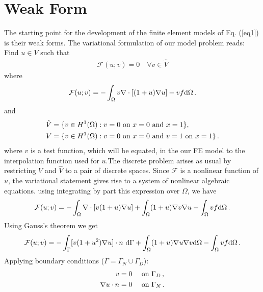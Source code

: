 \documentclass[]{article}
\begin{document}
\section{Weak Form} \label{sec: wf}
The starting point for the development of the finite element models of Eq. (\ref{eq1}) is their weak forms.
The variational formulation of our model problem reads: Find $u \in V$ such that
\begin{equation}\label{eq4}
	\begin{aligned}
		\mathcal{F}(u;v) = 0 \quad \forall v \in \hat{V}
	\end{aligned}
\end{equation}
where
\begin{equation}\label{eq5}
	\begin{aligned}
		\mathcal{F}(u; v) =-\int_\Omega v \nabla \cdot[(1+u) \nabla u] - v f \mathrm{d}\Omega\thinspace .
	\end{aligned}
\end{equation}
and
\begin{equation}\label{eq6}
	\begin{aligned}
		\hat{V} &= \{v \in H^1(\Omega) : v = 0 \text{ on } x=0\mbox{ and }x=1\}, \\
		V &= \{v \in H^1(\Omega) : v = 0 \text{ on } x=0\text{ and } v = 1\text{ on }x=1\}\thinspace.
	\end{aligned}
\end{equation}
where $v$ is a test function, which will be equated, in the our FE model to the interpolation function used for $u$.The discrete problem arises as usual by restricting $V$ and $\hat{V}$ to a pair of discrete spaces. Since $\mathcal{F}$ is a nonlinear function of $u$, the variational statement gives rise to a system of nonlinear algebraic equations. using integrating by part this expression over $\Omega$, we have
\begin{equation}\label{eq7}
	\begin{aligned}
		\mathcal{F}(u; v) = -\int_{\Omega} \nabla \cdot [v (1+u) \nabla u] + \int_{\Omega}  (1+u)\nabla v\nabla u - \int_{\Omega} v f \mathrm{d}\Omega\thinspace .
	\end{aligned}
\end{equation}
Using Gauss’s theorem we get
\begin{equation}\label{eq8}
	\begin{aligned}
		\mathcal{F}(u; v) =  -\int_{\Gamma} [v (1+u^2) \nabla u] \cdot n \ \mathrm{d} \Gamma + \int_{\Omega} (1+u)\nabla u \nabla v \mathrm{d} \Omega - \int_{\Omega} v f \mathrm{d} \Omega\thinspace .
	\end{aligned}
\end{equation}
Applying boundary conditions ($\Gamma = \Gamma_N \cup \Gamma_D$):
\begin{equation}\label{eq9}
	\begin{aligned}
		v= 0 \quad &\text{ on } \Gamma_D\thinspace, \\
		\nabla u \cdot n = 0 \quad &\text{ on } \Gamma_N \thinspace.
	\end{aligned}
\end{equation}
\end{document}
